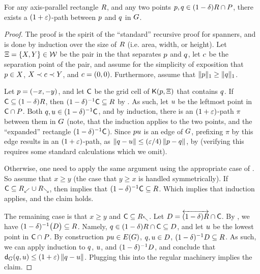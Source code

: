 \documentclass[12pt]{article}%
\begin{document}
\begin{lemma}
    For any axis-parallel rectangle $R$, and any two points
    $p, q \in (1-\delta)R \cap P$, there exists a
    $(1+\varepsilon)$-path between $p$ and $q$ in $G$.
\end{lemma}
\begin{proof}
    The proof is the spirit of the ``standard'' recursive proof for
    spanners, and is done by induction over the size of $R$ (i.e. area, width, or height). Let $\Xi = \{ X, Y \} \in \mathcal{W}$ be the pair in
    the \QSPD that separates $p$ and $q$, let $c$ be the
    separation point of the pair, and assume for the simplicity of
    exposition that $p \in X$, $X \prec c \prec Y$, and
    $c = (0,0)$. Furthermore, assume that
    $\|p\|_1 \geq \|q\|_1$.

    Let  $p = (-x,-y)$, and let $\mathsf{C}$ be the grid cell of $\mathsf{K}(p, \Xi)$ that contains
    $q$. If
    $\mathsf{C} \subseteq (1-\delta)R$, then
    $(1-\delta)^{-1}\mathsf{C} \subseteq R$ by 
    . As such, let $u$ be the leftmost point in
    $\mathsf{C} \cap P$. Both
    $q, u \in (1-\delta)^{-1}\mathsf{C}$, and by induction, there is an
    $(1+\varepsilon)$-path $\pi$ between them in $G$ (note, that the
    induction applies to the two points, and the ``expanded''
    rectangle $(1-\delta)^{-1}\mathsf{C}$). Since $p u$ is an edge of
    $G$, prefixing $\pi$ by this edge results in an $(1+\varepsilon)$-path,
    as $\left\| q - u \right\| \leq (\varepsilon/4) \left\| p - q \right\|$, by 
     (verifying this requires some standard
    calculations which we omit).

    Otherwise, one need to apply the same argument using the
    appropriate case of .  So assume that $x \geq y$
    (the case that $y \geq x$ is handled symmetrically). If
    $\mathsf{C} \subseteq R_\swarrow \cup R_\searrow$, then
     implies that
    $(1-\delta)^{-1} \mathsf{C} \subseteq R$. Which implies that
    induction applies, and the claim holds.

    The remaining case is that $x \geq y$ and
    $\mathsf{C} \subseteq R_\nwarrow$.  Let
    $D= \overleftrightarrow{ (1-\delta)R} \cap \mathsf{C}$.  By ,
    we have $(1-\delta)^{-1} \bigl(D \bigr) \subseteq
    R$. Namely,
    $q \in (1-\delta)R \cap \mathsf{C} \subseteq D$, and let
    $u$ be the lowest point in $\mathsf{C} \cap P$. By construction
    $\pa \pc \in \EGX{\G}$, $q, u \in D$,
    $(1-\delta)^{-1} D \subseteq R$. As such, we can apply
    induction to $q$, $u$, and $(1-\delta)^{-1} D$, and
    conclude that $\dGZ{\G}{\pb}{\pc} \leq (1+\eps) \dY{\pb}{\pc}$.
    Plugging this into the regular machinery implies the claim.
\end{proof}
\end{document}
